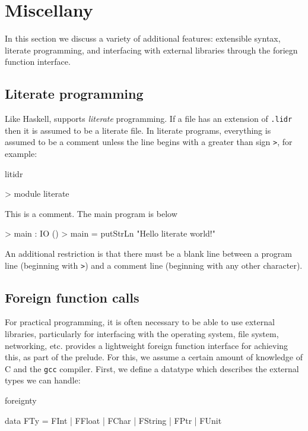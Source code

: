 \section{Miscellany}

In this section we discuss a variety of additional features: extensible syntax,
literate programming, and interfacing with external libraries through the
foriegn function interface.



\subsection{Literate programming}

Like Haskell, \Idris{} supports \emph{literate} programming. If a file has an
extension of \texttt{.lidr} then it is assumed to be a literate file. In literate
programs, everything is assumed to be a comment unless the line begins with a
greater than sign \texttt{>}, for example:

\begin{SaveVerbatim}{litidr}

> module literate

This is a comment. The main program is below

> main : IO ()
> main = putStrLn "Hello literate world!\n"

\end{SaveVerbatim}

\noindent
An additional restriction is that there must be a blank line between a program
line (beginning with \texttt{>}) and a comment line (beginning with any other
character).

\subsection{Foreign function calls}

For practical programming, it is often necessary to be able to use external libraries,
particularly for interfacing with the operating system, file system, networking, etc.
\Idris{} provides a lightweight foreign function interface for achieving this,
as part of the prelude. For this, we assume a certain amount of knowledge of
C and the \texttt{gcc} compiler. First, we define a datatype which describes the external
types we can handle:

\begin{SaveVerbatim}{foreignty}

data FTy = FInt | FFloat | FChar | FString | FPtr | FUnit

\end{SaveVerbatim}

